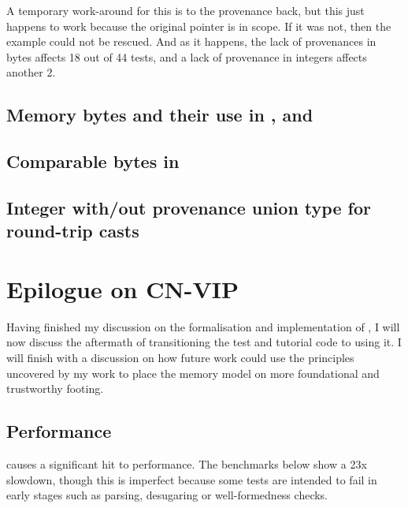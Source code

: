 A temporary work-around for this is to  the
provenance back, but this just happens to work because the original pointer is
in scope. If it was not, then the example could not be rescued. And as it
happens, the lack of provenances in bytes affects 18 out of 44 tests, and a
lack of provenance in integers affects another 2.


\section{Memory bytes and their use in , 
and }\label{sec:mem-bytes-use}

\section{Comparable bytes in }

\section{Integer with/out provenance union type for round-trip casts}

\chapter{Epilogue on CN-VIP}

Having finished my discussion on the formalisation and implementation of
, I will now discuss the aftermath of transitioning the  test
and tutorial code to using it. I will finish with a discussion on how future
work could use the principles uncovered by my work to place the  memory
model on more foundational and trustworthy footing.

\section{Performance}\label{sec:vip-perf}

 causes a significant hit to performance. The benchmarks below show
a 2\textendash{}3x slowdown, though this is imperfect because some tests are intended to
fail in early stages such as parsing, desugaring or well-formedness checks.

